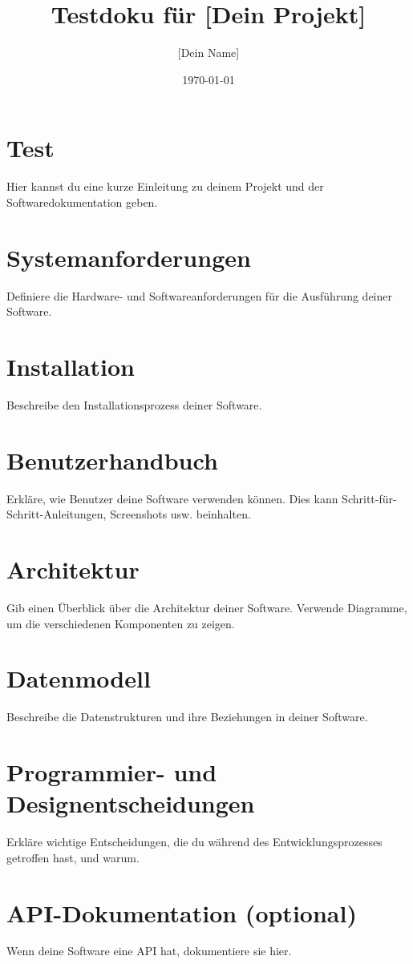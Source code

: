 \documentclass[a4paper, 12pt]{article}
\title{Testdoku für [Dein Projekt]}
\author{[Dein Name]}
\date{\today}
\begin{document}
    \maketitle
    \tableofcontents
    \newpage

    \section{Test}
    Hier kannst du eine kurze Einleitung zu deinem Projekt und der Softwaredokumentation geben.

    \section{Systemanforderungen}
    Definiere die Hardware- und Softwareanforderungen für die Ausführung deiner Software.

    \section{Installation}
    Beschreibe den Installationsprozess deiner Software.

    \section{Benutzerhandbuch}
    Erkläre, wie Benutzer deine Software verwenden können. Dies kann Schritt-für-Schritt-Anleitungen, Screenshots usw. beinhalten.

    \section{Architektur}
    Gib einen Überblick über die Architektur deiner Software. Verwende Diagramme, um die verschiedenen Komponenten zu zeigen.

    \section{Datenmodell}
    Beschreibe die Datenstrukturen und ihre Beziehungen in deiner Software.

    \section{Programmier- und Designentscheidungen}
    Erkläre wichtige Entscheidungen, die du während des Entwicklungsprozesses getroffen hast, und warum.

    \section{API-Dokumentation (optional)}
    Wenn deine Software eine API hat, dokumentiere sie hier.
\end{document}
